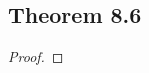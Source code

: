 \documentclass[../../main.tex]{subfiles}
\begin{document}
\subsection{Theorem 8.6}
\begin{wts}

\end{wts}
\begin{proof}

\end{proof}
\end{document}
